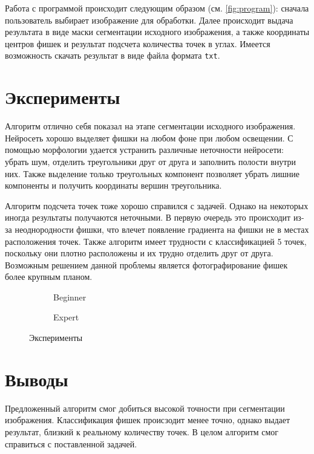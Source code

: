 \documentclass[11pt]{extarticle}
\begin{document}
Работа с программой происходит следующим образом (см. \autoref{fig:program}): сначала пользователь выбирает изображение для обработки.
Далее происходит выдача результата в виде маски сегментации исходного изображения, а также координаты центров фишек и результат подсчета количества точек в углах. Имеется возможность скачать результат в виде файла формата \verb|txt|.


\section{Эксперименты}

Алгоритм отлично себя показал на этапе сегментации исходного изображения. Нейросеть хорошо выделяет фишки на любом фоне при любом освещении. С помощью морфологии удается устранить различные неточности нейросети: убрать шум, отделить треугольники друг от друга и заполнить полости внутри них. Также выделение только треугольных компонент позволяет убрать лишние компоненты и получить координаты вершин треугольника.

Алгоритм подсчета точек тоже хорошо справился с задачей. Однако на некоторых иногда результаты получаются неточными. В первую очередь это происходит из-за неоднородности фишки, что влечет появление градиента на фишки не в местах расположения точек. Также алгоритм имеет трудности с классификацией 5 точек, поскольку они плотно расположены и их трудно отделить друг от друга. Возможным решением данной проблемы является фотографирование фишек более крупным планом.
\begin{figure}[h]
  \centering
  \begin{subfigure}[b]{0.45\textwidth}
    
    \caption{Beginner}
  \end{subfigure}
  \begin{subfigure}[b]{0.45\textwidth}
    
    \caption{Expert}
  \end{subfigure}
  \caption{Эксперименты}
  \label{fig:exp}
\end{figure}


\section{Выводы}
Предложенный алгоритм смог добиться высокой точности при сегментации изображения. Классификация фишек происзодит менее точно, однако выдает результат, близкий к реальному количеству точек. В целом алгоритм смог справиться с поставленной задачей.
\end{document}
